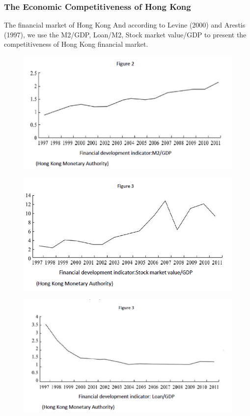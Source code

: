 \documentclass[slidestop,uncompress,mathsans, 12pt]{beamer}
\begin{document}
\begin{frame}
\frametitle{The Economic Competitiveness of Hong Kong}%
The financial market of Hong Kong
And according to Levine (2000) and Arestis (1997), we use the M2/GDP, Loan/M2, Stock market value/GDP to present the competitiveness of Hong Kong financial market.\\
\begin{overprint}
\begin{figure}[h]
\centering
\includegraphics[width=1\textwidth]{hk10.png}
\label{threadsVsSync}
\end{figure}
\begin{figure}[h]
\centering
\includegraphics[width=1\textwidth]{hk11.png}
\label{threadsVsSync}
\end{figure}
\begin{figure}[h]
\centering
\includegraphics[width=1\textwidth]{hk12.png}
\label{threadsVsSync}
\end{figure}
\end{overprint}
\end{frame}
\end{document}

